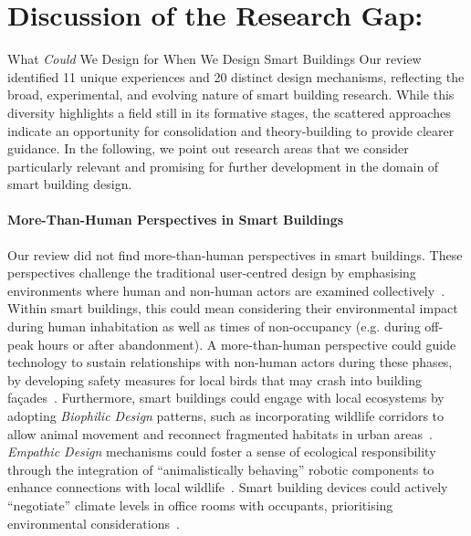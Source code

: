 \section{Discussion of the Research Gap:} What \emph{Could} We Design for When We Design Smart Buildings
\label{sec-ch2:discussion}
Our review identified 11 unique experiences and 20 distinct design mechanisms, reflecting the broad, experimental, and evolving nature of smart building research. While this diversity highlights a field still in its formative stages, the scattered approaches indicate an opportunity for consolidation and theory-building to provide clearer guidance. In the following, we point out research areas that we consider particularly relevant and promising for further development in the domain of smart building design. 

\paragraph{More-Than-Human Perspectives in Smart Buildings} Our review did not find more-than-human perspectives in smart buildings. These perspectives challenge the traditional user-centred design by emphasising environments where human and non-human actors are examined collectively~\cite{giaccardi2020technology, coskun2022more, wakkary2021things}. Within smart buildings, this could mean considering their environmental impact during human inhabitation as well as times of non-occupancy (e.g. during off-peak hours or after abandonment). A more-than-human perspective could guide technology to sustain relationships with non-human actors during these phases, by developing safety measures for local birds that may crash into building fa\c{c}ades~\cite{boone2024embodied}. Furthermore, smart buildings could engage with local ecosystems by adopting \textit{Biophilic Design} patterns, such as incorporating wildlife corridors to allow animal movement and reconnect fragmented habitats in urban areas~\cite{zellmer2022urban}. \textit{Empathic Design} mechanisms could foster a sense of ecological responsibility through the integration of ``animalistically behaving'' robotic components to enhance connections with local wildlife~\cite{gil2015biophilic}. Smart building devices could actively ``negotiate'' climate levels in office rooms with occupants, prioritising environmental considerations~\cite{loh2010please}.

